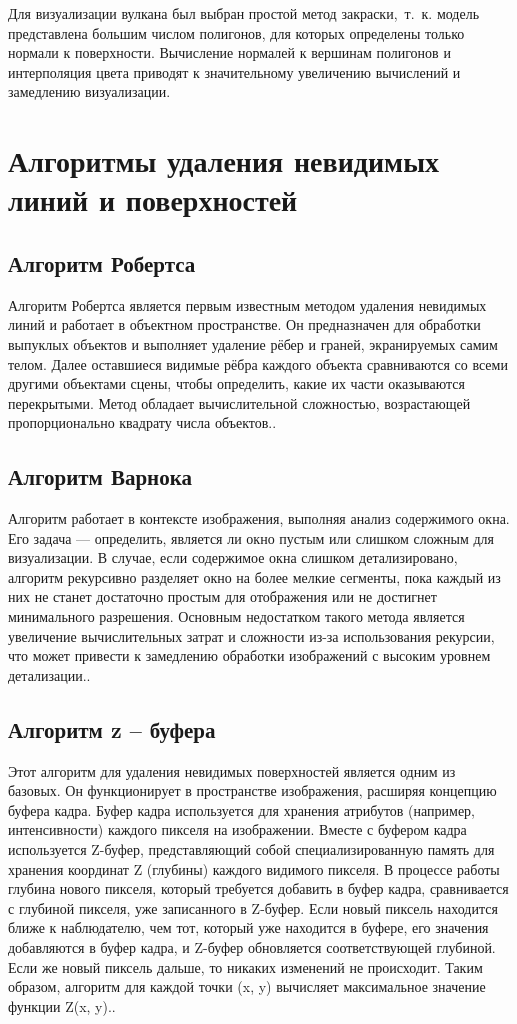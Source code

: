 Для визуализации вулкана был выбран простой метод закраски,~т.~к. модель представлена большим числом полигонов, для которых определены только нормали к поверхности. Вычисление нормалей к вершинам полигонов и интерполяция цвета приводят к значительному увеличению вычислений и замедлению визуализации.
 
\section{Алгоритмы удаления невидимых линий и поверхностей}

\subsection{Алгоритм Робертса} 

Алгоритм Робертса является первым известным методом удаления невидимых линий и работает в объектном пространстве. Он предназначен для обработки выпуклых объектов и выполняет удаление рёбер и граней, экранируемых самим телом. Далее оставшиеся видимые рёбра каждого объекта сравниваются со всеми другими объектами сцены, чтобы определить, какие их части оказываются перекрытыми. Метод обладает вычислительной сложностью, возрастающей пропорционально квадрату числа объектов.\cite{lit2}.

\subsection{Алгоритм Варнока}
Алгоритм работает в контексте изображения, выполняя анализ содержимого окна. Его задача --- определить, является ли окно пустым или слишком сложным для визуализации. В случае, если содержимое окна слишком детализировано, алгоритм рекурсивно разделяет окно на более мелкие сегменты, пока каждый из них не станет достаточно простым для отображения или не достигнет минимального разрешения. Основным недостатком такого метода является увеличение вычислительных затрат и сложности из-за использования рекурсии, что может привести к замедлению обработки изображений с высоким уровнем детализации.\cite{lit2}.

\subsection{Алгоритм z – буфера}
Этот алгоритм для удаления невидимых поверхностей является одним из базовых. Он функционирует в пространстве изображения, расширяя концепцию буфера кадра. Буфер кадра используется для хранения атрибутов (например, интенсивности) каждого пикселя на изображении. Вместе с буфером кадра используется Z-буфер, представляющий собой специализированную память для хранения координат Z (глубины) каждого видимого пикселя. В процессе работы глубина нового пикселя, который требуется добавить в буфер кадра, сравнивается с глубиной пикселя, уже записанного в Z-буфер. Если новый пиксель находится ближе к наблюдателю, чем тот, который уже находится в буфере, его значения добавляются в буфер кадра, и Z-буфер обновляется соответствующей глубиной. Если же новый пиксель дальше, то никаких изменений не происходит. Таким образом, алгоритм для каждой точки (x, y) вычисляет максимальное значение функции Z(x, y).\cite{lit2}.


